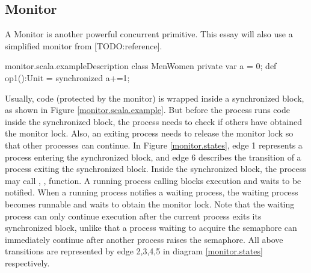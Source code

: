 \documentclass{article}
\begin{document}
\subsection{Monitor}
A Monitor is another powerful concurrent primitive. This essay will also use a simplified monitor from [TODO:reference].

\begin{scalainline}{monitor.scala.example}{Description}
class MenWomen {
  private var a = 0;
  def op1():Unit = synchronized{
    a+=1;
  }
}
\end{scalainline}

Usually, code (protected by the monitor) is wrapped inside a synchronized block, as shown in Figure \ref{monitor.scala.example}. But before the process runs code inside the synchronized block, the process needs to check if others have obtained the monitor lock. Also, an exiting process needs to release the monitor lock so that other processes can continue. In Figure \ref{monitor.states}, edge 1 represents a process entering the synchronized block, and edge 6 describes the transition of a process exiting the synchronized block. Inside the synchronized block, the process may call , ,  function. A running process calling  blocks execution and waits to be notified. When a running process notifies a waiting process, the waiting process becomes runnable and waits to obtain the monitor lock. Note that the waiting process can only continue execution after the current process exits its synchronized block, unlike that a process waiting to acquire the semaphore can immediately continue after another process raises the semaphore. All above transitions are represented by edge 2,3,4,5 in diagram \ref{monitor.states} respectively. 
\end{document}
